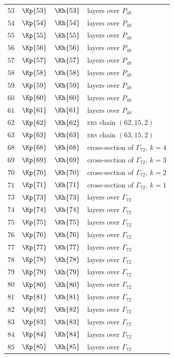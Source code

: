 \documentclass[11pt]{amsart}
\theoremstyle{remark}
\newcommand{\Pff}{P_{48}}
\newcommand{\Gsz}{\Gamma_{72}}
\begin{document}
\begin{longtable}{rrrl}
$53$ & $\Kp{53}$ & $\Kh{53}$ & layers over $\Pff$\\
$54$ & $\Kp{54}$ & $\Kh{54}$ & layers over $\Pff$\\
$55$ & $\Kp{55}$ & $\Kh{55}$ & layers over $\Pff$\\
$56$ & $\Kp{56}$ & $\Kh{56}$ & layers over $\Pff$\\
$57$ & $\Kp{57}$ & $\Kh{57}$ & layers over $\Pff$\\
$58$ & $\Kp{58}$ & $\Kh{58}$ & layers over $\Pff$\\
$59$ & $\Kp{59}$ & $\Kh{59}$ & layers over $\Pff$\\
$60$ & $\Kp{60}$ & $\Kh{60}$ & layers over $\Pff$\\
$61$ & $\Kp{61}$ & $\Kh{61}$ & layers over $\Pff$\\
$62$ & $\Kp{62}$ & $\Kh{62}$ & \textsc{ers} chain $(62,15,2)$\\
$63$ & $\Kp{63}$ & $\Kh{63}$ & \textsc{ers} chain $(63,15,2)$\\
$68$ & $\Kp{68}$ & $\Kh{68}$ & cross-section of $\Gsz$, $k=4$\\
$69$ & $\Kp{69}$ & $\Kh{69}$ & cross-section of $\Gsz$, $k=3$\\
$70$ & $\Kp{70}$ & $\Kh{70}$ & cross-section of $\Gsz$, $k=2$\\
$71$ & $\Kp{71}$ & $\Kh{71}$ & cross-section of $\Gsz$, $k=1$\\
$73$ & $\Kp{73}$ & $\Kh{73}$ & layers over $\Gsz$\\
$74$ & $\Kp{74}$ & $\Kh{74}$ & layers over $\Gsz$\\
$75$ & $\Kp{75}$ & $\Kh{75}$ & layers over $\Gsz$\\
$76$ & $\Kp{76}$ & $\Kh{76}$ & layers over $\Gsz$\\
$77$ & $\Kp{77}$ & $\Kh{77}$ & layers over $\Gsz$\\
$78$ & $\Kp{78}$ & $\Kh{78}$ & layers over $\Gsz$\\
$79$ & $\Kp{79}$ & $\Kh{79}$ & layers over $\Gsz$\\
$80$ & $\Kp{80}$ & $\Kh{80}$ & layers over $\Gsz$\\
$81$ & $\Kp{81}$ & $\Kh{81}$ & layers over $\Gsz$\\
$82$ & $\Kp{82}$ & $\Kh{82}$ & layers over $\Gsz$\\
$83$ & $\Kp{83}$ & $\Kh{83}$ & layers over $\Gsz$\\
$84$ & $\Kp{84}$ & $\Kh{84}$ & layers over $\Gsz$\\
$85$ & $\Kp{85}$ & $\Kh{85}$ & layers over $\Gsz$\\

\end{longtable}
\end{document}
